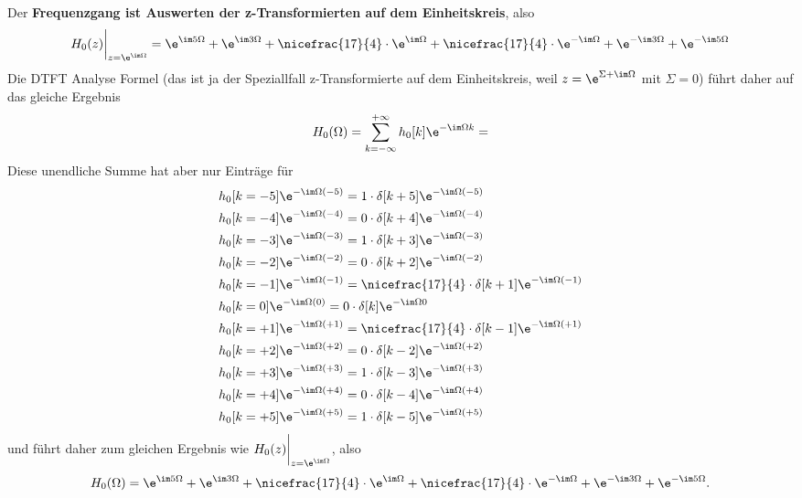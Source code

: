 Der \textbf{Frequenzgang ist Auswerten der z-Transformierten auf dem Einheitskreis}, also
\begin{align}
H_0(z)\bigg|_{z=\e^{\im\Omega}}
=
\e^{\im 5 \Omega} + \e^{\im 3 \Omega} + \nicefrac{17}{4}\cdot \e^{\im \Omega}
 + \nicefrac{17}{4}\cdot \e^{-\im\Omega} + \e^{-\im 3 \Omega} + \e^{-\im 5 \Omega}
\end{align}
%
Die DTFT Analyse Formel (das ist ja der Speziallfall
z-Transformierte auf dem Einheitskreis, weil $z=\e^{\Sigma+\im\Omega}$ mit
$\Sigma=0$) führt daher auf das gleiche Ergebnis
\begin{align}
H_0(\Omega) = \sum_{k=-\infty}^{+\infty} h_0[k] \e^{-\im\Omega k}=
\end{align}
Diese unendliche Summe hat aber nur Einträge für
\begin{align}
&h_0[k=-5] \e^{-\im\Omega (-5)} =  1\cdot\delta[k+5] \e^{-\im\Omega (-5)}\nonumber\\
&h_0[k=-4] \e^{-\im\Omega (-4)} =  0\cdot\delta[k+4] \e^{-\im\Omega (-4)}\nonumber\\
&h_0[k=-3] \e^{-\im\Omega (-3)} =  1\cdot\delta[k+3] \e^{-\im\Omega (-3)}\nonumber\\
&h_0[k=-2] \e^{-\im\Omega (-2)} =  0\cdot\delta[k+2] \e^{-\im\Omega (-2)}\nonumber\\
&h_0[k=-1] \e^{-\im\Omega (-1)} =  \nicefrac{17}{4}\cdot\delta[k+1] \e^{-\im\Omega (-1)}\nonumber\\
&h_0[k=0] \e^{-\im\Omega (0)} =  0\cdot\delta[k] \e^{-\im\Omega 0}\nonumber\\
&h_0[k=+1] \e^{-\im\Omega (+1)} =  \nicefrac{17}{4}\cdot\delta[k-1] \e^{-\im\Omega (+1)}\nonumber\\
&h_0[k=+2] \e^{-\im\Omega (+2)} =  0\cdot\delta[k-2] \e^{-\im\Omega (+2)}\nonumber\\
&h_0[k=+3] \e^{-\im\Omega (+3)} =  1\cdot\delta[k-3] \e^{-\im\Omega (+3)}\nonumber\\
&h_0[k=+4] \e^{-\im\Omega (+4)} =  0\cdot\delta[k-4] \e^{-\im\Omega (+4)}\nonumber\\
&h_0[k=+5] \e^{-\im\Omega (+5)} =  1\cdot\delta[k-5] \e^{-\im\Omega (+5)}
\end{align}
und führt daher zum gleichen Ergebnis wie $H_0(z)\bigg|_{z=\e^{\im\Omega}}$, also
\begin{align}
H_0(\Omega)
=
\e^{\im 5 \Omega} + \e^{\im 3 \Omega} + \nicefrac{17}{4}\cdot \e^{\im \Omega}
 + \nicefrac{17}{4}\cdot \e^{-\im\Omega} + \e^{-\im 3 \Omega} + \e^{-\im 5 \Omega}.
\end{align}
